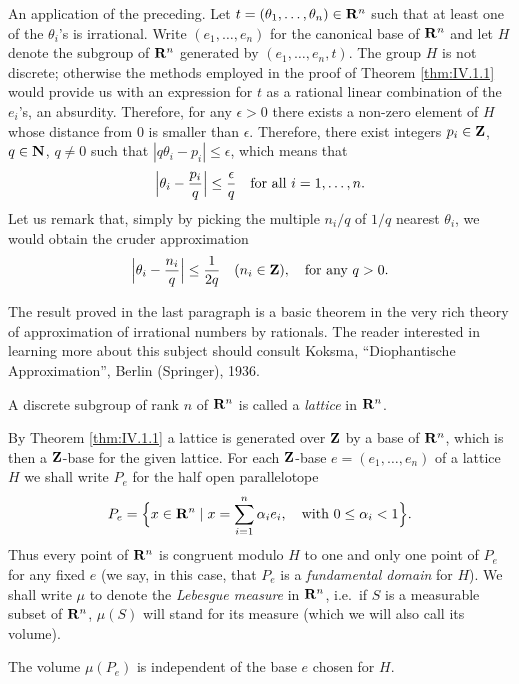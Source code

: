 An application of the preceding. Let
$t=(\theta_{1},\ldots,\theta_{n})\in\mathbf{R}^{n}$ such that at least one of the
$\theta_{i}$'s is irrational. Write $(e_{1},\ldots,e_{n})$ for the canonical
base of $\mathbf{R}^{n}$ and let $H$ denote the subgroup of $\mathbf{R}^{n}$ generated by
$(e_{1},\ldots,e_{n},t)$. The group $H$ is not discrete; otherwise the
methods employed in the proof of Theorem \ref{thm:IV.1.1} would provide us
with an expression for $t$ as a rational linear combination of the
$e_{i}$'s, an absurdity. Therefore, for any $\epsilon>0$ there exists a
non-zero element of $H$ whose distance from $0$ is smaller than $\epsilon$.
Therefore, there exist integers $p_{i}\in\mathbf{Z}$, $q\in\mathbf{N}$, $q\neq0$ such that
$|q\theta_{i}-p_{i}|\leq\epsilon$, which means that
\[
\Bigl|\theta_{i}-\frac{p_{i}}{q}\Bigr|\leq\frac{\epsilon}{q}
\quad\text{for all }i=1,\ldots,n.
\]
Let us remark that, simply by picking the multiple $n_{i}/q$ of $1/q$ nearest
$\theta_{i}$, we would obtain the cruder approximation
\[
\Bigl|\theta_{i}-\frac{n_{i}}{q}\Bigr|\leq\frac{1}{2q}
\quad(n_{i}\in\mathbf{Z}),\quad\text{for any }q>0.
\]

The result proved in the last paragraph is a basic theorem in the very rich
theory of approximation of irrational numbers by rationals. The reader
interested in learning more about this subject should consult Koksma,
``Diophantische Approximation'', Berlin (Springer), 1936.

\begin{definition}
\label{def:IV.1.1}
A discrete subgroup of rank $n$ of $\mathbf{R}^{n}$ is called a \emph{lattice} in
$\mathbf{R}^{n}$.
\end{definition}

By Theorem \ref{thm:IV.1.1} a lattice is generated over $\mathbf{Z}$ by a base of
$\mathbf{R}^{n}$, which is then a $\mathbf{Z}$-base for the given lattice. For each
$\mathbf{Z}$-base $e=(e_{1},\ldots,e_{n})$ of a lattice $H$ we shall write $P_{e}$
for the half open parallelotope
\[
P_{e}=\Bigl\{x\in\mathbf{R}^{n}\mid x=\sum_{i=1}^{n}\alpha_{i}e_{i},\quad
\text{with }0\leq\alpha_{i}<1\Bigr\}.
\]
Thus every point of $\mathbf{R}^{n}$ is congruent modulo $H$ to one and only one
point of $P_{e}$ for any fixed $e$ (we say, in this case, that $P_{e}$ is a
\emph{fundamental domain} for $H$). We shall write $\mu$ to denote the
\emph{Lebesgue measure} in $\mathbf{R}^{n}$, i.e.\ if $S$ is a measurable subset of
$\mathbf{R}^{n}$, $\mu(S)$ will stand for its measure (which we will also call its
volume).

\begin{lemma}
\label{lem:IV.1.1}
The volume $\mu(P_{e})$ is independent of the base $e$ chosen for $H$.
\end{lemma}

